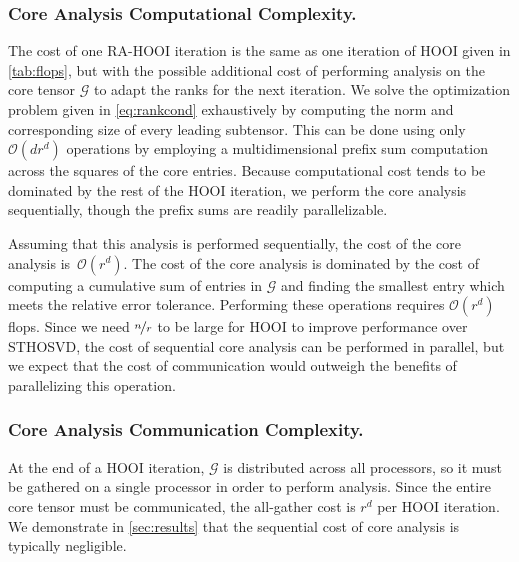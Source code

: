     \subsubsection{Core Analysis Computational Complexity.}

        The cost of one RA-HOOI iteration is the same as one iteration of HOOI given in
        \cref{tab:flops}, but with the possible additional cost of performing analysis
        on the core tensor $\mathcal{G}$ to adapt the ranks for the next iteration. We solve
        the optimization problem given in \cref{eq:rankcond} exhaustively by computing
        the norm and corresponding size of every leading subtensor. This can be done
        using only $\mathcal O(dr^d)$ operations by employing a multidimensional prefix
        sum computation across the squares of the core entries. Because computational
        cost tends to be dominated by the rest of the HOOI iteration, we perform the
        core analysis sequentially, though the prefix sums are readily parallelizable.

        Assuming that this analysis is performed sequentially, the cost of the
        core analysis is $\mathcal{O}(r^d)$. The cost of the core analysis is
        dominated by the cost of computing a cumulative sum of entries in
        $\mathcal{G}$ and finding the smallest entry which meets the relative error
        tolerance. Performing these operations requires $\mathcal{O}(r^d)$
        flops. Since we need $\nicefrac nr$ to be large for HOOI to improve performance
        over STHOSVD, the cost of sequential core analysis can be performed in
        parallel, but we expect that the cost of communication would outweigh
        the benefits of parallelizing this operation.

    \subsubsection{Core Analysis Communication Complexity.}

        At the end of a HOOI iteration, $\mathcal{G}$ is distributed across all processors,
        so it must be gathered on a single processor in order to perform analysis. Since
        the entire core tensor must be communicated, the all-gather cost is $r^d$ per
        HOOI iteration.
        We demonstrate in \cref{sec:results} that the sequential cost of core analysis is typically negligible.


